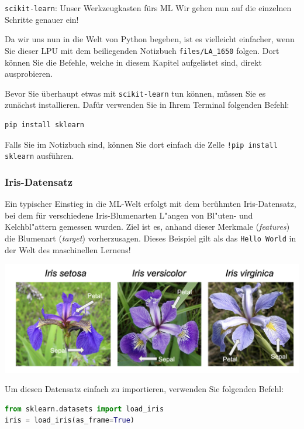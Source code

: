 \begin{lpu}{\texttt{scikit-learn}: Unser Werkzeugkasten fürs ML}
Wir gehen nun auf die einzelnen Schritte genauer ein!

\begin{hinweis}
    Da wir uns nun in die Welt von Python begeben, ist es vielleicht einfacher, wenn Sie dieser LPU mit dem beiliegenden Notizbuch \texttt{files/LA\_1650} folgen. Dort können Sie die Befehle, welche in diesem Kapitel aufgelistet sind, direkt ausprobieren.
\end{hinweis}

Bevor Sie überhaupt etwas mit \texttt{scikit-learn} tun können, müssen Sie es zunächst installieren. Dafür verwenden Sie in Ihrem Terminal folgenden Befehl:

\begin{lstlisting}[language=Bash]
pip install sklearn
\end{lstlisting}

Falls Sie im Notizbuch sind, können Sie dort einfach die Zelle \texttt{!pip install sklearn} ausführen.


\subsubsection*{Iris-Datensatz}
Ein typischer Einstieg in die ML-Welt erfolgt mit dem berühmten Iris-Datensatz, bei dem für verschiedene Iris-Blumenarten L"angen von Bl"uten- und Kelchbl"attern gemessen wurden. Ziel ist es, anhand dieser Merkmale (\textit{features}) die Blumenart (\textit{target}) vorherzusagen. Dieses Beispiel gilt als das \texttt{Hello World} in der Welt des maschinellen Lernens!

\begin{center}
  \includegraphics[width=0.9\linewidth]{iris.png}
\end{center}

Um diesen Datensatz einfach zu importieren, verwenden Sie folgenden Befehl:

\begin{lstlisting}[language=Python]
from sklearn.datasets import load_iris
iris = load_iris(as_frame=True)
\end{lstlisting}


\end{lpu}
